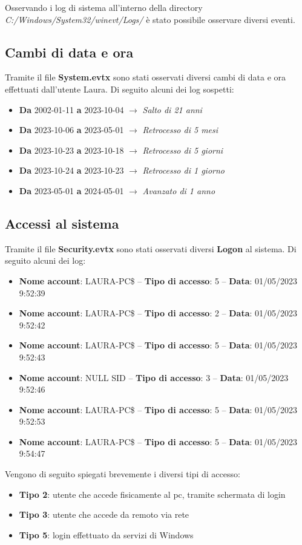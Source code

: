 Osservando i log di sistema all'interno della directory\\
\textit{C:/Windows/System32/winevt/Logs/} è stato possibile osservare diversi eventi.

\subsection{Cambi di data e ora}
Tramite il file \textbf{System.evtx} sono stati osservati diversi cambi di data e ora effettuati dall'utente Laura. Di seguito alcuni dei log sospetti:
\begin{itemize}
    \item \textbf{Da} 2002-01-11 \textbf{a} 2023-10-04 $\rightarrow$ \textit{Salto di 21 anni}
    \item \textbf{Da} 2023-10-06 \textbf{a} 2023-05-01 $\rightarrow$ \textit{Retrocesso di 5 mesi}
    \item \textbf{Da} 2023-10-23 \textbf{a} 2023-10-18 $\rightarrow$ \textit{Retrocesso di 5 giorni}
    \item \textbf{Da} 2023-10-24 \textbf{a} 2023-10-23 $\rightarrow$ \textit{Retrocesso di 1 giorno}
    \item \textbf{Da} 2023-05-01 \textbf{a} 2024-05-01 $\rightarrow$ \textit{Avanzato di 1 anno}
\end{itemize}

\subsection{Accessi al sistema}
Tramite il file \textbf{Security.evtx} sono stati osservati diversi \textbf{Logon} al sistema. Di seguito alcuni dei log:
\begin{itemize}
    \item \textbf{Nome account}: LAURA-PC\$ -- \textbf{Tipo di accesso}: 5 -- \textbf{Data}: 01/05/2023 9:52:39
    \item \textbf{Nome account}: LAURA-PC\$ -- \textbf{Tipo di accesso}: 2 -- \textbf{Data}: 01/05/2023 9:52:42
    \item \textbf{Nome account}: LAURA-PC\$ -- \textbf{Tipo di accesso}: 5 -- \textbf{Data}: 01/05/2023 9:52:43
    \item \textbf{Nome account}: NULL SID -- \textbf{Tipo di accesso}: 3 -- \textbf{Data}: 01/05/2023 9:52:46
    \item \textbf{Nome account}: LAURA-PC\$ -- \textbf{Tipo di accesso}: 5 -- \textbf{Data}: 01/05/2023 9:52:53
    \item \textbf{Nome account}: LAURA-PC\$ -- \textbf{Tipo di accesso}: 5 -- \textbf{Data}: 01/05/2023 9:54:47
\end{itemize}
Vengono di seguito spiegati brevemente i diversi tipi di accesso:
\begin{itemize}
    \item \textbf{Tipo 2}: utente che accede fisicamente al pc, tramite schermata di login
    \item \textbf{Tipo 3}: utente che accede da remoto via rete
    \item \textbf{Tipo 5}: login effettuato da servizi di Windows
\end{itemize}